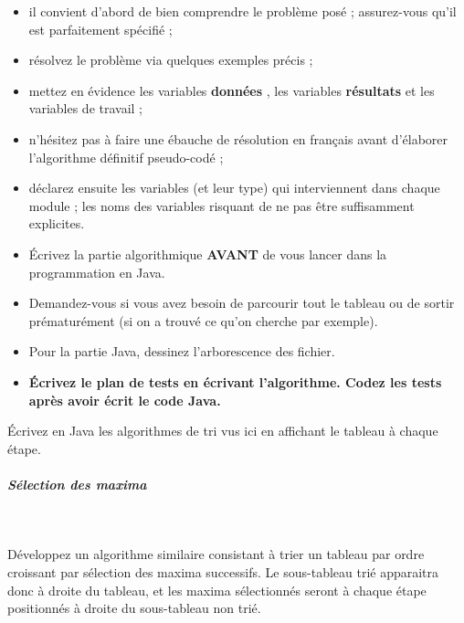 \documentclass[11pt,a4paper]{article}
\begin{document}
					\begin{itemize}
				
			\item il convient d'abord de bien comprendre le probl\`eme pos\'e ; assurez-vous qu'il est parfaitement sp\'ecifi\'e ;
			\item r\'esolvez le probl\`eme via quelques exemples pr\'ecis ;
			\item mettez en \'evidence les variables \textbf{\guillemotleft  donn\'ees \guillemotright }, les variables \textbf{\guillemotleft  r\'esultats \guillemotright } et les variables de travail ;
			\item n'h\'esitez pas \`a faire une \'ebauche de r\'esolution en fran\c cais avant d'\'elaborer l'algorithme d\'efinitif pseudo-cod\'e ;
			\item d\'eclarez ensuite les variables (et leur type) qui interviennent dans chaque module ; les noms des variables risquant de ne pas \^etre suffisamment explicites.
			\item \'Ecrivez la partie algorithmique \textbf{AVANT} de vous lancer dans la programmation en Java.
			\item Demandez-vous si vous avez besoin de parcourir tout le tableau ou de sortir pr\'ematur\'ement (si on a trouv\'e ce qu'on cherche par exemple).
			\item Pour la partie Java, dessinez l'arborescence des fichier. 
			\item \textbf{\'Ecrivez le plan de tests en \'ecrivant l'algorithme. Codez les tests apr\`es avoir \'ecrit le code Java.}
					\end{itemize}
				
            \par
        
        \'Ecrivez en Java les algorithmes de tri vus ici en affichant le tableau \`a chaque \'etape.
      
            \par
        
			
		\subparagraph{S\'election des maxima} 
		
					\textcolor{white}{.} \par
				
        D\'eveloppez un algorithme similaire consistant \`a trier un tableau par ordre croissant par
        s\'election des maxima successifs. Le sous-tableau tri\'e apparaitra donc \`a droite du tableau,
        et les maxima s\'electionn\'es seront \`a chaque \'etape positionn\'es \`a droite du sous-tableau non tri\'e.
      
\end{document}

